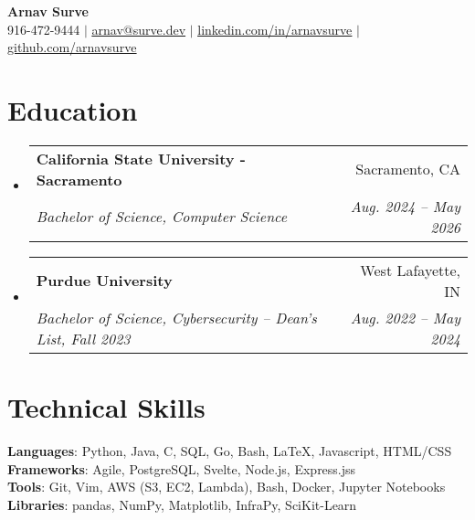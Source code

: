 \documentclass[letterpaper,11pt]{article}
\makeatletter
\newcommand{\resumeSubheading}[4]{
  \vspace{-2pt}\item
    \begin{tabular*}{0.97\textwidth}[t]{l@{\extracolsep{\fill}}r}
      \textbf{#1} & #2 \\
      \textit{\small#3} & \textit{\small #4} \\
    \end{tabular*}\vspace{-7pt}
}
\newcommand{\resumeSubHeadingListStart}{\begin{itemize}[leftmargin=0.15in, label={}]}
\newcommand{\resumeSubHeadingListEnd}{\end{itemize}}
\makeatother
\begin{document}

\begin{center}
    \textbf{\Huge Arnav Surve} \\ \vspace{1pt}
    \small 916-472-9444 $|$ \href{mailto:arnav@surve.dev}{\underline{arnav@surve.dev}} $|$ 
    \href{https://linkedin.com/in/arnavsurve/}{\underline{linkedin.com/in/arnavsurve}} $|$
    \href{https://github.com/arnavsurve}{\underline{github.com/arnavsurve}}
\end{center}

\section{Education}
  \resumeSubHeadingListStart
    \resumeSubheading
      {California State University - Sacramento}{Sacramento, CA}
      {Bachelor of Science, Computer Science}{Aug. 2024 -- May 2026}
    \resumeSubheading
      {Purdue University}{West Lafayette, IN}
      {Bachelor of Science, Cybersecurity -- Dean's List, Fall 2023}{Aug. 2022 -- May 2024}
  \resumeSubHeadingListEnd

%
\section{Technical Skills}
 \begin{itemize}[leftmargin=0.15in, label={}]
    \small{\item{
     \textbf{Languages}{: Python, Java, C, SQL, Go, Bash, \LaTeX, Javascript, HTML/CSS} \\
     \textbf{Frameworks}{: Agile, PostgreSQL, Svelte, Node.js, Express.jss} \\
     \textbf{Tools}{: Git, Vim, AWS (S3, EC2, Lambda), Bash, Docker, Jupyter Notebooks} \\
     \textbf{Libraries}{: pandas, NumPy, Matplotlib, InfraPy, SciKit-Learn}
    }}
 \end{itemize}
\end{document}
